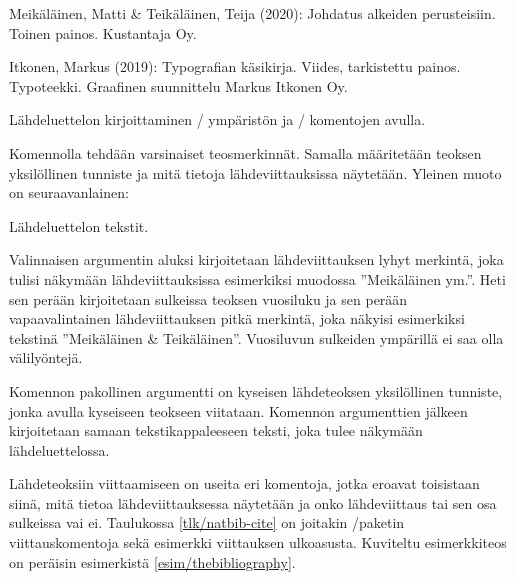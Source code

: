 \begin{esimerkki*}

\begin{koodilohko}
\begin{thebibliography}{00}

  Meikäläinen, Matti \& Teikäläinen, Teija (2020): Johdatus alkeiden
  perusteisiin. Toinen painos. Kustantaja Oy.

 Itkonen, Markus (2019): Typografian
  käsikirja. Viides, tarkistettu painos. Typoteekki. Graafinen
  suunnittelu Markus Itkonen Oy.

\end{thebibliography}
\end{koodilohko}
  \caption{Lähdeluettelon kirjoittaminen \-/
    ympäristön ja \-/ komentojen avulla.}
  \label{esim/thebibliography}
\end{esimerkki*}

Komennolla  tehdään varsinaiset teosmerkinnät. Samalla
määritetään teoksen yksilöllinen tunniste ja mitä tietoja
lähdeviittauksissa näytetään. Yleinen muoto on seuraavanlainen:

\begin{koodilohkosis}
 Lähdeluettelon tekstit.
\end{koodilohkosis}

Valinnaisen argumentin aluksi kirjoitetaan lähdeviittauksen lyhyt
merkintä, joka tulisi näkymään lähdeviittauksissa esimerkiksi muodossa
''Meikäläinen ym.''. Heti sen perään kirjoitetaan sulkeissa teoksen
vuosiluku ja sen perään vapaavalintainen lähdeviittauksen pitkä
merkintä, joka näkyisi esimerkiksi tekstinä ''Meikäläinen \&
Teikäläinen''. Vuosiluvun sulkeiden ympärillä ei saa olla välilyöntejä.

Komennon pakollinen argumentti on kyseisen lähdeteoksen yksilöllinen
tunniste, jonka avulla kyseiseen teokseen viitataan. Komennon
argumenttien jälkeen kirjoitetaan samaan tekstikappaleeseen teksti, joka
tulee näkymään lähdeluettelossa.

Lähdeteoksiin viittaamiseen on useita eri komentoja, jotka eroavat
toisistaan siinä, mitä tietoa lähdeviittauksessa näytetään ja onko
lähdeviittaus tai sen osa sulkeissa vai ei. Taulukossa
\ref{tlk/natbib-cite} on joitakin \-/paketin
viittauskomentoja sekä esimerkki viittauksen ulkoasusta. Kuviteltu
esimerkkiteos on peräisin esimerkistä \ref{esim/thebibliography}.

